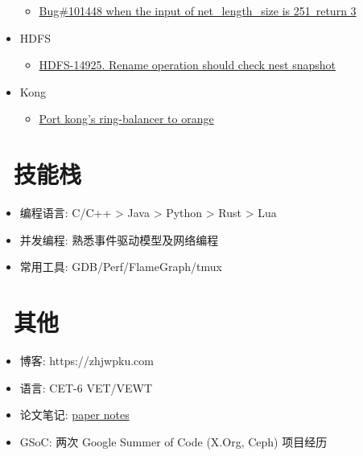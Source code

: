 \documentclass{resume}
\begin{document}
\begin{onehalfspacing}
\begin{itemize}
\begin{itemize}
        \item \href{https://github.com/mysql/mysql-server/pull/311}{Bug\#101448 when the input of net\_length\_size is 251\, return 3}
      \end{itemize}
    \item HDFS
      \begin{itemize}
        \item \href{https://github.com/apache/hadoop/pull/1670/files}{HDFS-14925. Rename operation should check nest snapshot}
      \end{itemize}
    \item Kong
      \begin{itemize}
        \item \href{https://github.com/orlabs/orange/pull/138}{Port kong's ring-balancer to orange}
      \end{itemize}
  \end{itemize}
  \end{onehalfspacing}

\section{\faWrench\ 技能栈}
\begin{itemize}[parsep=0.5ex]
  \item 编程语言:  C/C++ > Java > Python > Rust > Lua
  \item 并发编程: 熟悉事件驱动模型及网络编程
  \item 常用工具: GDB/Perf/FlameGraph/tmux
\end{itemize}

\section{\faCogs\ 其他}
\begin{itemize}[parsep=0.5ex]
  \item 博客: https://zhjwpku.com
  \item 语言: CET-6 VET/VEWT
  \item 论文笔记: \href{https://paper-notes.zhjwpku.com/}{paper notes}
  \item GSoC: 两次 Google Summer of Code (X.Org, Ceph) 项目经历
\end{itemize}
\end{document}
